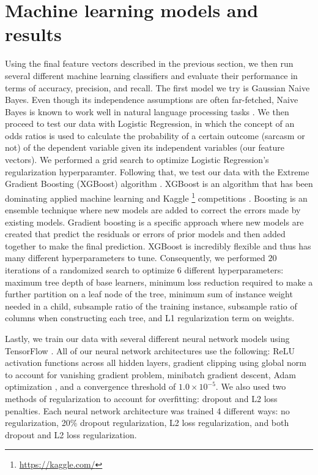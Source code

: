 \documentclass{article}
\begin{document}
\section{Machine learning models and results}

Using the final feature vectors described in the previous section, we then run several different machine learning classifiers and evaluate their performance in terms of accuracy, precision, and recall. The first model we try is Gaussian Naive Bayes. Even though its independence assumptions are often far-fetched, Naive Bayes is known to work well in natural language processing tasks \citep{kim2006some}. We then proceed to test our data with Logistic Regression, in which the concept of an odds ratios is used to calculate the probability of a certain outcome (sarcasm or not) of the dependent variable given its independent variables (our feature vectors). We performed a grid search to optimize Logistic Regression's regularization hyperparamter. Following that, we test our data with the Extreme Gradient Boosting (XGBoost) algorithm \citep{friedman2001greedy}. XGBoost is an algorithm that has been dominating applied machine learning and Kaggle \footnote{\url{https://kaggle.com/}} competitions \citep{chen2016xgboost}. Boosting is an ensemble technique where new models are added to correct the errors made by existing models. Gradient boosting is a specific approach where new models are created that predict the residuals or errors of prior models and then added together to make the final prediction. XGBoost is incredibly flexible and thus has many different hyperparameters to tune. Consequently, we performed $20$ iterations of a randomized search to optimize 6 different hyperparameters: maximum tree depth of base learners, minimum loss reduction required to make a further partition on a leaf node of the tree, minimum sum of instance weight needed in a child, subsample ratio of the training instance, subsample ratio of columns when constructing each tree, and L1 regularization term on weights. 

Lastly, we train our data with several different neural network models using TensorFlow \citep{abadi2016tensorflow}. All of our neural network architectures use the following: ReLU activation functions \citep{nair2010rectified} across all hidden layers, gradient clipping using global norm \citep{pascanu2013difficulty} to account for vanishing gradient problem, minibatch gradient descent, Adam optimization \citep{kingma2014adam}, and a convergence threshold of $1.0 \times 10^{-5}$. We also used two methods of regularization to account for overfitting: dropout \citep{hinton2012improving} and L2 loss penalties. Each neural network architecture was trained 4 different ways: no regularization, 20\% dropout regularization, L2 loss regularization, and both dropout and L2 loss regularization. 
\end{document}
